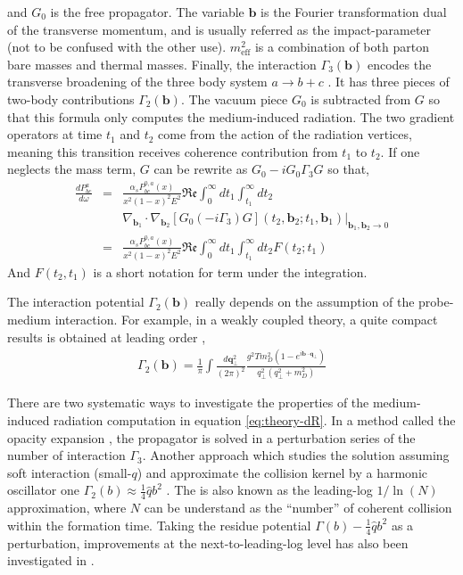 and $G_0$ is the free propagator. The variable $\mathbf{b}$ is the Fourier transformation dual of the transverse momentum, and is usually referred as the impact-parameter (not to be confused with the other use).
$m^2_\textrm{eff}$ is a combination of both parton bare masses and thermal masses.
Finally, the interaction $\Gamma_3(\mathbf{b})$ encodes the transverse broadening of the three body system $a\rightarrow b+c$ \cite{Zakharov:1997uu}.
It has three pieces of two-body contributions $\Gamma_2(\mathbf{b})$.
The vacuum piece $G_0$ is subtracted from $G$ so that this formula only computes the medium-induced radiation.
The two gradient operators at time $t_1$ and $t_2$ come from the action of the radiation vertices, meaning this transition receives coherence contribution from $t_1$ to $t_2$.
If one neglects the mass term, $G$ can be rewrite as $G_0 -i G_0\Gamma_3 G$ so that,
\begin{eqnarray}
\nonumber
\frac{dP^{a}_{bc}}{d\omega} &=& \frac{\alpha_s P^{0,a}_{bc}(x)}{x^2(1-x)^2 E^2}\mathfrak{Re}\int_0^\infty dt_1 \int_{t_1}^{\infty} dt_2\\ &&\nabla_{\mathbf{b}_1} \cdot\nabla_{\mathbf{b}_2} [G_0(-i\Gamma_3) G](t_2, \mathbf{b}_2;t_1, \mathbf{b}_1)|_{\mathbf{b}_1, \mathbf{b}_2 \rightarrow 0}\\
&=& \frac{\alpha_s P^{0,a}_{bc}(x)}{x^2(1-x)^2 E^2}\mathfrak{Re}\int_0^\infty dt_1 \int_{t_1}^{\infty} dt_2 F(t_2; t_1)
\end{eqnarray}
And $F(t_2, t_1)$ is a short notation for term under the integration.

The interaction potential $\Gamma_2(\mathbf{b})$ really depends on the assumption of the probe-medium interaction.
For example, in a weakly coupled theory, a quite compact results is obtained at leading order \cite{Aurenche:2002pd},
\begin{eqnarray}
\Gamma_2(\mathbf{b}) = \frac{1}{\pi}\int \frac{d\mathbf{q}_\perp^2}{(2\pi)^2} \frac{g^2 T m_D^2 (1-e^{i\mathbf{b}\cdot\mathbf{q_\perp}})}{q_\perp^2(q_\perp^2+m_D^2)}
\end{eqnarray}

There are two systematic ways to investigate the properties of the medium-induced radiation computation in equation \ref{eq:theory-dR}.
In a method called the opacity expansion \cite{Wiedemann:2000za,Gyulassy:1999zd}, the propagator is solved in a perturbation series of the number of interaction $\Gamma_3$. 
Another approach which studies the solution assuming soft interaction (small-$q$) and approximate the collision kernel by a harmonic oscillator one $\Gamma_2(b) \approx \frac{1}{4}\hat{q}b^2$ \cite{Baier:1996kr,Baier:1998yf,Baier:1996sk}.
The is also known as the leading-log $1/\ln(N)$ approximation, where $N$ can be understand as the ``number'' of coherent collision within the formation time.
Taking the residue potential $\Gamma(b) - \frac{1}{4}\hat{q}b^2$ as a perturbation, improvements at the next-to-leading-log level has also been investigated in \cite{Arnold:2008zu,Mehtar-Tani:2019tvy}.

